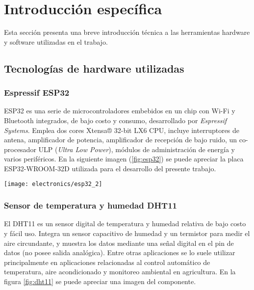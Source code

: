 
\chapter{Introducción específica} %

\label{Chapter2}

Esta sección presenta una breve introducción técnica a las herramientas hardware y software utilizadas en el trabajo.

\section{Tecnologías de hardware utilizadas}

\subsection{Espressif ESP32}


ESP32 \cite{ESP32} es una serie de microcontroladores embebidos en un chip con Wi-Fi y Bluetooth integrados, de bajo costo y consumo, desarrollado por \textit{Espressif Systems}. Emplea dos cores Xtensa® 32-bit LX6 CPU, incluye interruptores de antena, amplificador de potencia, amplificador de recepción de bajo ruido, un co-procesador ULP (\textit{Ultra Low Power}), módulos de administración de energía y varios periféricos.
En la siguiente imagen (\ref{fig:esp32}) se puede apreciar la placa ESP32-WROOM-32D \cite{ESP32_wroom_32d_datasheet} utilizada para el desarrollo del presente trabajo.

\begin{center}
   \texttt{[image: electronics/esp32\_2]}
   \label{fig:esp32}
\end{center}


\subsection{Sensor de temperatura y humedad DHT11}

El DHT11 \cite{DHT11_datasheet} es un sensor digital de temperatura y humedad relativa de bajo costo y fácil uso. Integra un sensor capacitivo de humedad y un termistor para medir el aire circundante, y muestra los datos mediante una señal digital en el pin de datos (no posee salida analógica). Entre otras aplicaciones se lo suele utilizar principalmente en aplicaciones relacionadas al control automático de temperatura, aire acondicionado y monitoreo ambiental en agricultura. En la figura \ref{fig:dht11} se puede apreciar una imagen del componente.

